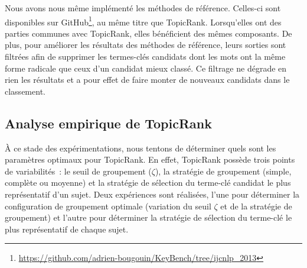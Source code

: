       Nous avons nous même implémenté les méthodes de référence. Celles-ci sont
      disponibles sur
      GitHub\footnote{\url{https://github.com/adrien-bougouin/KeyBench/tree/ijcnlp_2013}},
      au même titre que TopicRank. Lorsqu'elles ont des parties communes avec
      TopicRank, elles bénéficient des mêmes composants. De plus, pour améliorer
      les résultats des méthodes de référence, leurs sorties sont filtrées afin
      de supprimer les termes-clés candidats dont les mots ont la même forme
      radicale que ceux d'un candidat mieux classé. Ce filtrage ne dégrade en
      rien les résultats et a pour effet de faire monter de nouveaux candidats
      dans le classement.

  \subsection{Analyse empirique de TopicRank}
  \label{subsection:configuration_empirique_de_topicrank}
    À ce stade des expérimentations, nous tentons de déterminer quels sont les
    paramètres optimaux pour TopicRank. En effet, TopicRank possède trois points
    de variabilités~: le seuil de groupement ($\zeta$), la stratégie de
    groupement (simple, complète ou moyenne) et la stratégie de sélection du
    terme-clé candidat le plus représentatif d'un sujet. Deux expériences sont
    réalisées, l'une pour déterminer la configuration de groupement optimale
    (variation du seuil $\zeta$ et de la stratégie de groupement) et l'autre
    pour déterminer la stratégie de sélection du terme-clé le plus représentatif
    de chaque sujet.

